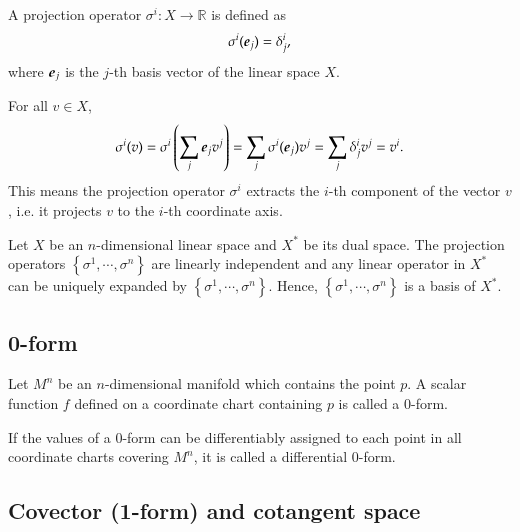 \documentclass[11pt, a4paper]{book}
\begin{document}
\begin{Definition}
  A projection operator $\sigma^i: X \rightarrow \mathbb{R}$ is defined as
  \begin{equation}
    \label{eq:projection-operator}
    \sigma^i(\boldsymbol{e}_j) = \delta^i_j,
  \end{equation}
  where $\boldsymbol{e}_j$ is the $j$-th basis vector of the linear space $X$.
\end{Definition}

For all $v\in X$,
\begin{equation*}
  \sigma^i(v) = \sigma^{i}\left( \sum_j\boldsymbol{e}_jv^j \right) = \sum_j
  \sigma^i(\boldsymbol{e}_j) v^j = \sum_j\delta^i_j v^j = v^i.
\end{equation*}
This means the projection operator $\sigma^i$ extracts the $i$-th component of the
vector $v$, i.e. it projects $v$ to the $i$-th coordinate axis.

\begin{Proposition}
  Let $X$ be an $n$-dimensional linear space and $X^{*}$ be its dual space. The projection
  operators $\left\{ \sigma^1,\cdots,\sigma^n \right\}$ are linearly independent and any
  linear operator in $X^{*}$ can be uniquely expanded by $\left\{ \sigma^1,\cdots,\sigma^n
  \right\}$. Hence, $\left\{ \sigma^1,\cdots,\sigma^n \right\}$ is a basis of $X^{*}$.
\end{Proposition}

\subsection{0-form}
\label{sec:0-form}

\begin{Definition}[0-form]
  Let $M^n$ be an $n$-dimensional manifold which contains the point $p$. A scalar function
  $f$ defined on a coordinate chart containing $p$ is called a 0-form.
\end{Definition}

\begin{Definition}
  If the values of a 0-form can be differentiably assigned to each point in all coordinate
  charts covering $M^n$, it is called a differential 0-form.
\end{Definition}

\subsection{Covector (1-form) and cotangent space}
\label{sec:1-form}
\end{document}

